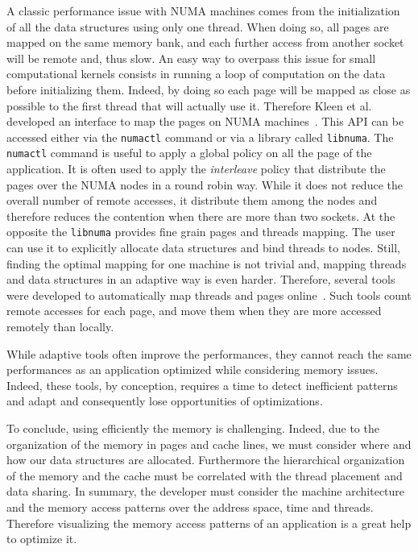 A classic performance issue with \gls{NUMA} machines comes from the initialization of all the data structures using only one thread.
When doing so, all pages are mapped on the same memory bank, and each further access from another socket will be remote and, thus slow.
An easy way to overpass this issue for small computational kernels consists in running a loop of computation on the data before initializing them.
Indeed, by doing so each page will be mapped as close as possible to the first thread that will actually use it.
Therefore Kleen et al. developed an interface to map the pages on \gls{NUMA} machines~\cite{Kleen05NUMA}.
This \gls{API} can be accessed either via the \texttt{numactl} command or via a library called \texttt{libnuma}.
The \texttt{numactl} command is useful to apply a global policy on all the page of the application.
It is often used to apply the \emph{interleave} policy that distribute the pages over the \gls{NUMA} nodes in a round robin way.
While it does not reduce the overall number of remote accesses, it distribute them among the nodes and therefore reduces the contention when there are more than two sockets.
At the opposite the \texttt{libnuma} provides fine grain pages and threads mapping.
The user can use it to explicitly allocate data structures and bind threads to nodes.
Still, finding the optimal mapping for one machine is not trivial and, mapping threads and data structures in an adaptive way is even harder.
Therefore, several tools were developed to automatically map threads and pages online~\cite{Diener14kMAF,Corbet12Toward}.
Such tools count remote accesses for each page, and move them when they are more accessed remotely than locally.

While adaptive tools often improve the performances, they cannot reach the same performances as an application optimized while considering memory issues.
Indeed, these tools, by conception, requires a time to detect inefficient patterns and adapt and consequently lose opportunities of optimizations.

To conclude, using efficiently the memory is challenging.
Indeed, due to the organization of the memory in pages and cache lines, we must consider where and how our data structures are allocated.
Furthermore the hierarchical organization of the memory and the cache must be correlated with the thread placement and data sharing.
In summary, the developer must consider the machine architecture and the memory access patterns over the address space, time and threads.
Therefore visualizing the memory access patterns of an application is a great help to optimize it.

